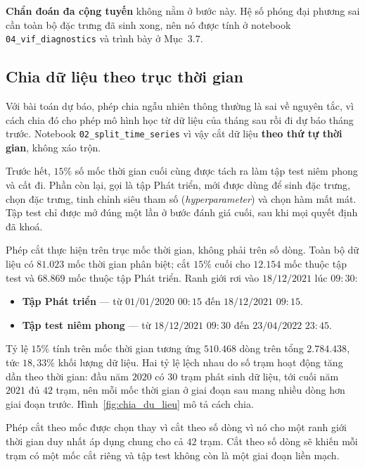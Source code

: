 \documentclass[12pt, a4paper]{report}
\begin{document}
\textbf{Chẩn đoán đa cộng tuyến} không nằm ở bước này. Hệ số phóng đại phương sai cần toàn bộ
đặc trưng đã sinh xong, nên nó được tính ở notebook \texttt{04\_vif\_diagnostics} và trình bày ở
Mục~$3.7$.

\FloatBarrier
\subsection{Chia dữ liệu theo trục thời gian}

Với bài toán dự báo, phép chia ngẫu nhiên thông thường là sai về nguyên tắc, vì cách chia đó cho
phép mô hình học từ dữ liệu của tháng sau rồi đi dự báo tháng trước. Notebook
\texttt{02\_split\_time\_series} vì vậy cắt dữ liệu \textbf{theo thứ tự thời gian}, không
xáo trộn.

Trước hết, $15\%$ số mốc thời gian cuối cùng được tách ra làm tập test niêm
phong và cất đi. Phần còn lại, gọi là tập Phát triển, mới được dùng để sinh đặc trưng,
chọn đặc trưng, tinh chỉnh siêu tham số (\textit{hyperparameter}) và chọn hàm mất mát. Tập test chỉ được mở đúng
một lần ở bước đánh giá cuối, sau khi mọi quyết định đã khoá.

Phép cắt thực hiện trên trục mốc thời gian, không phải trên số dòng. Toàn bộ dữ
liệu có $81.023$ mốc thời gian phân biệt; cắt $15\%$ cuối cho $12.154$ mốc thuộc tập test
và $68.869$ mốc thuộc tập Phát triển. Ranh giới rơi vào $18/12/2021$ lúc $09{:}30$:

\begin{itemize}
    \item \textbf{Tập Phát triển} --- từ $01/01/2020$ $00{:}15$ đến $18/12/2021$ $09{:}15$.
    \item \textbf{Tập test niêm phong} --- từ $18/12/2021$ $09{:}30$ đến $23/04/2022$ $23{:}45$.
\end{itemize}

Tỷ lệ $15\%$ tính trên mốc thời gian tương ứng $510.468$ dòng trên tổng $2.784.438$, tức
$18{,}33\%$ khối lượng dữ liệu. Hai tỷ lệ lệch nhau do số trạm hoạt động tăng dần
theo thời gian: đầu năm $2020$ có $30$ trạm phát sinh dữ liệu, tới cuối năm $2021$ đủ $42$
trạm, nên mỗi mốc thời gian ở giai đoạn sau mang nhiều dòng hơn giai đoạn trước.
Hình~\ref{fig:chia_du_lieu} mô tả cách chia.

Phép cắt theo mốc được chọn thay vì cắt theo số dòng vì nó cho một ranh giới thời gian duy
nhất áp dụng chung cho cả $42$ trạm. Cắt theo số dòng sẽ khiến mỗi trạm có một mốc cắt riêng
và tập test không còn là một giai đoạn liền mạch.
\end{document}
